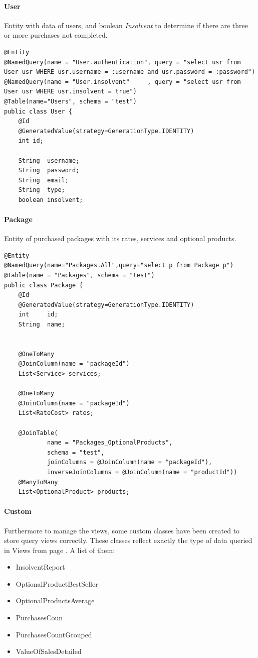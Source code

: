 \documentclass{article}
\begin{document}
\paragraph{User}
Entity with data of users, and boolean \emph{Insolvent} to determine if there are three or more purchases not completed.
\begin{lstlisting}
@Entity
@NamedQuery(name = "User.authentication", query = "select usr from User usr WHERE usr.username = :username and usr.password = :password")
@NamedQuery(name = "User.insolvent"     , query = "select usr from User usr WHERE usr.insolvent = true")
@Table(name="Users", schema = "test")
public class User {
    @Id
    @GeneratedValue(strategy=GenerationType.IDENTITY)
    int id;

    String  username;
    String  password;
    String  email;
    String  type;
    boolean insolvent;
\end{lstlisting}

\paragraph{Package}
Entity of purchased packages with its rates, services and optional products.
\begin{lstlisting}
@Entity
@NamedQuery(name="Packages.All",query="select p from Package p")
@Table(name = "Packages", schema = "test")
public class Package {
    @Id
    @GeneratedValue(strategy=GenerationType.IDENTITY)
    int     id;
    String  name;


    @OneToMany
    @JoinColumn(name = "packageId")
    List<Service> services;

    @OneToMany
    @JoinColumn(name = "packageId")
    List<RateCost> rates;

    @JoinTable(
            name = "Packages_OptionalProducts",
            schema = "test",
            joinColumns = @JoinColumn(name = "packageId"),
            inverseJoinColumns = @JoinColumn(name = "productId"))
    @ManyToMany
    List<OptionalProduct> products;
\end{lstlisting}

\paragraph{Custom}
Furthermore to manage the views, some custom classes have been created to store query views correctly. These classes reflect exactly the type of data queried in Views from page \pageref{views}.
A list of them:
\begin{itemize}
    \item InsolventReport
    \item OptionalProductBestSeller
    \item OptionalProductsAverage
    \item PurchasesCoun
    \item PurchasesCountGrouped
    \item ValueOfSalesDetailed
\end{itemize}
\end{document}
